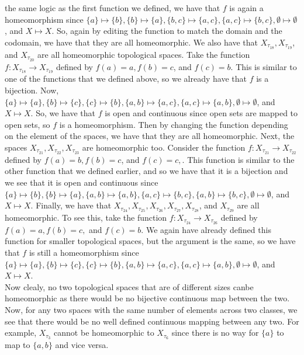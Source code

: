 \begin{solution}
    the same logic as the first function we defined, we have that $f$ is again a homeomorphism since
    $\{a\}\mapsto\{b\}, \{b\}\mapsto\{a\}, \{b,c\}\mapsto\{a,c\}, \{a,c\}\mapsto\{b,c\},
    \emptyset\mapsto\emptyset$, and $X\mapsto X$. So, again by editing the function to match the domain
    and the codomain, we have that they are all homeomorphic. We also have that
    $X_{\tau_{18}}, X_{\tau_{19}}$, and $X_{\tau_{20}}$ are all homeomorphic topological spaces. Take
    the function $f:X_{\tau_{18}}\rightarrow X_{\tau_{19}}$ defined by $f(a)=a, f(b)=c$, and $f(c)=b$.
    This is similar to one of the functions that we defined above, so we already have that $f$ is a
    bijection. Now,
    $\{a\}\mapsto\{a\}, \{b\}\mapsto\{c\}, \{c\}\mapsto\{b\}, \{a,b\}\mapsto\{a,c\},
    \{a,c\}\mapsto\{a,b\}, \emptyset\mapsto\emptyset$, and $X\mapsto X$. So, we have that $f$ is open
    and continuous since open sets are mapped to open sets, so $f$ is a homeomorphism. Then by changing
    the function depending on the element of the spaces, we have that they are all homeomorphic. Next,
    the spaces $X_{\tau_{21}}, X_{\tau_{22}}, X_{\tau_{23}}$ are homeomorphic too. Consider the function
    $f:X_{\tau_{21}}\rightarrow X_{\tau_{22}}$ defined by $f(a)=b, f(b)=c$, and  $f(c)=c,$. This
    function is similar to the other function that we defined earlier, and so we have that it is a
    bijection and we see that it is open and continuous since
    $\{a\}\mapsto\{b\}, \{b\}\mapsto\{a\}, \{a,b\}\mapsto\{a,b\}, \{a,c\}\mapsto\{b,c\},
    \{a,b\}\mapsto\{b,c\}, \emptyset\mapsto\emptyset$, and $X\mapsto X$. Finally, we have that
    $X_{\tau_{24}}, X_{\tau_{25}}, X_{\tau_{26}}, X_{\tau_{27}}, X_{\tau_{28}}$, and $X_{\tau_{29}}$ are
    all homeomorphic. To see this, take the function $f:X_{\tau_{24}}\rightarrow X_{\tau_{26}}$ defined
    by $f(a)=a, f(b)=c,$ and $f(c)=b$. We again have already defined this function for smaller
    topological spaces, but the argument is the same, so we have that $f$ is still a homeomorphism since
    $\{a\}\mapsto\{a\}, \{b\}\mapsto\{c\}, \{c\}\mapsto\{b\}, \{a,b\}\mapsto\{a,c\},
    \{a,c\}\mapsto\{a,b\}, \emptyset\mapsto\emptyset$, and $X\mapsto X$.\\

    Now clealy, no two topological spaces that are of different sizes canbe homeomorphic as there would
    be no bijective continuous map between the two. Now, for any two spaces with the same number of
    elements across two classes, we see that there would be no well defined continuous mapping between
    any two. For example, $X_{\tau_3}$ cannot be homeomorphic to $X_{\tau_6}$ since there is no way for
    $\{a\}$ to map to $\{a,b\}$ and vice versa.

\end{solution}